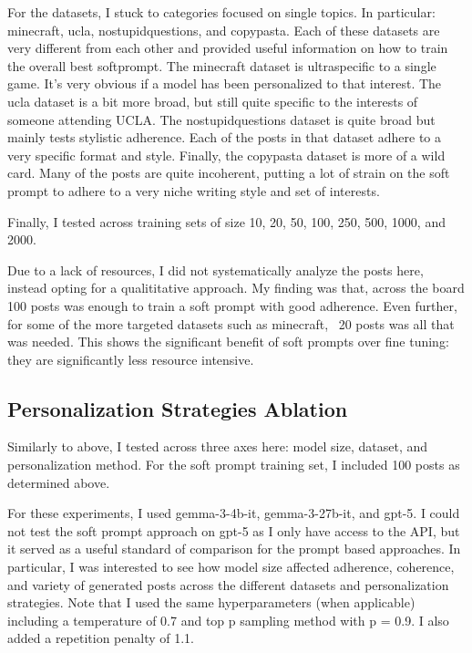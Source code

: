 \documentclass[11pt]{article}
\begin{document}
For the datasets, I stuck to categories focused on single topics. In particular: minecraft, ucla, nostupidquestions, and copypasta. Each of these datasets are very different from each other and provided useful information on how to train the overall best softprompt. The minecraft dataset is ultraspecific to a single game. It's very obvious if a model has been personalized to that interest. The ucla dataset is a bit more broad, but still quite specific to the interests of someone attending UCLA. The nostupidquestions dataset is quite broad but mainly tests stylistic adherence. Each of the posts in that dataset adhere to a very specific format and style. Finally, the copypasta dataset is more of a wild card. Many of the posts are quite incoherent, putting a lot of strain on the soft prompt to adhere to a very niche writing style and set of interests. 

Finally, I tested across training sets of size 10, 20, 50, 100, 250, 500, 1000, and 2000. 

Due to a lack of resources, I did not systematically analyze the posts here, instead opting for a qualititative approach. My finding was that, across the board 100 posts was enough to train a soft prompt with good adherence. Even further, for some of the more targeted datasets such as minecraft, ~20 posts was all that was needed. This shows the significant benefit of soft prompts over fine tuning: they are significantly less resource intensive.

\subsection{Personalization Strategies Ablation}

Similarly to above, I tested across three axes here: model size, dataset, and personalization method. For the soft prompt training set, I included 100 posts as determined above. 

For these experiments, I used gemma-3-4b-it, gemma-3-27b-it, and gpt-5. I could not test the soft prompt approach on gpt-5 as I only have access to the API, but it served as a useful standard of comparison for the prompt based approaches. In particular, I was interested to see how model size affected adherence, coherence, and variety of generated posts across the different datasets and personalization strategies. Note that I used the same hyperparameters (when applicable) including a temperature of 0.7 and top p sampling method with p = 0.9. I also added a repetition penalty of 1.1.
\end{document}
